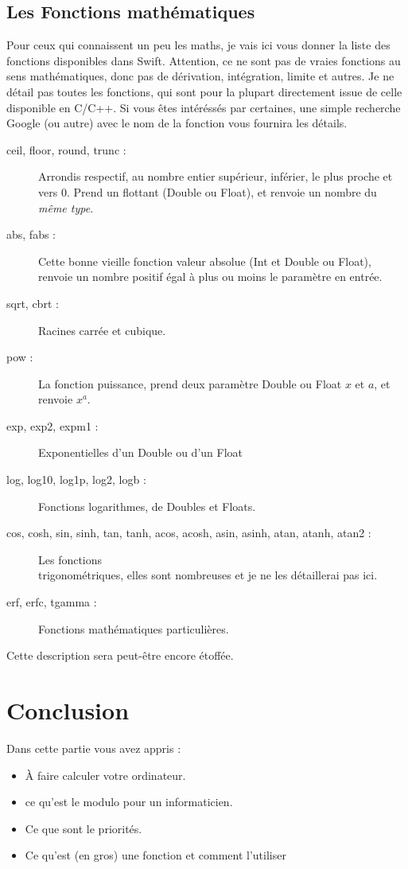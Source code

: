\subsection{Les Fonctions mathématiques}

Pour ceux qui connaissent un peu les maths, je vais ici vous donner la liste des fonctions disponibles dans Swift. Attention, ce ne sont pas de vraies fonctions au sens mathématiques, donc pas de dérivation, intégration, limite et autres.
Je ne détail pas toutes les fonctions, qui sont pour la plupart directement issue de celle disponible en C/C++.
Si vous êtes intéréssés par certaines, une simple recherche Google (ou autre) avec le nom de la fonction vous fournira les détails.
\begin{description}
\item[ceil, floor, round, trunc :]
Arrondis respectif, au nombre entier supérieur, inférier, le plus proche et vers 0. Prend un flottant (Double ou Float), et renvoie un nombre du \emph{même type}.
\item[abs, fabs :]
Cette bonne vieille fonction valeur absolue (Int et Double ou Float), renvoie un nombre positif égal à plus ou moins le paramètre en entrée.
\item[sqrt, cbrt :]
Racines carrée et cubique.
\item[pow :]
La fonction puissance, prend deux paramètre Double ou Float $x$ et $a$, et renvoie $x^{a}$. %
\item[exp, exp2, expm1 :]
Exponentielles d'un Double ou d'un Float
\item[log, log10, log1p, log2, logb :]
Fonctions logarithmes, de Doubles et Floats.
\item[cos, cosh, sin, sinh, tan, tanh, acos, acosh, asin, asinh, atan, atanh, atan2 :]
Les fonctions\\
trigonométriques, elles sont nombreuses et je ne les détaillerai pas ici.
\item[erf, erfc, tgamma :]
Fonctions mathématiques particulières.
\end{description}
Cette description sera peut-être encore étoffée.
\section*{Conclusion}
{}
Dans cette partie vous avez appris :
\begin{itemize}
\item À faire calculer votre ordinateur.
\item ce qu'est le modulo pour un informaticien.
\item Ce que sont le priorités.
\item Ce qu'est (en gros) une fonction et comment l'utiliser
\end{itemize}
